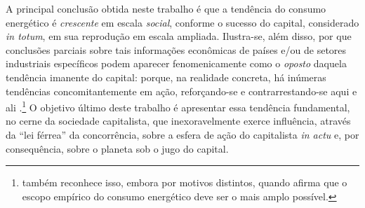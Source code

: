 \documentclass[12pt]{article}
\begin{document}
A principal conclusão obtida neste trabalho é que a tendência do consumo energético é \textit{crescente} em escala \textit{social}, conforme o sucesso do capital, considerado \textit{in totum}, em sua reprodução em escala ampliada. Ilustra-se, além disso, por que conclusões parciais sobre tais informações econômicas de países e/ou de setores industriais específicos podem aparecer fenomenicamente como o \textit{oposto} daquela tendência imanente do capital: porque, na realidade concreta, há inúmeras tendências concomitantemente em ação, reforçando-se e contrarrestando-se aqui e ali \parencite{Bhaskar1978,Bhaskar1998,Medeiros2013}.\footnote{\textcite[p. 15]{Sorrell2007} também reconhece isso, embora por motivos distintos, quando afirma que o escopo empírico do consumo energético deve ser o mais amplo possível.} O objetivo último deste trabalho é apresentar essa tendência fundamental, no cerne da sociedade capitalista, que inexoravelmente exerce influência, através da ``lei férrea'' da concorrência, sobre a esfera de ação do capitalista \textit{in actu} e, por consequência, sobre o planeta sob o jugo do capital. 






\printbibliography
\end{document}
